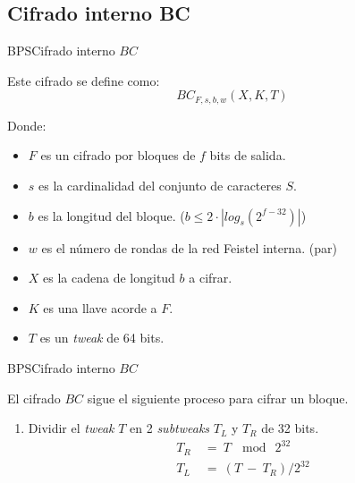 %
%

\subsection{Cifrado interno BC}

\begin{frame}{BPS}{Cifrado interno $BC$}

  Este cifrado se define como:
    \begin{equation*}
      BC_{F,s,b,w}(X,K,T)
    \end{equation*}

  Donde:
  \begin{itemize}
    \item $F$ es un cifrado por bloques de $f$ bits de salida.
    \item $s$ es la cardinalidad del conjunto de caracteres $S$.
    \item $b$ es la longitud del bloque. ($b \leq 2 \cdot |log_s(2^{f-32})|$)
    \item $w$ es el número de rondas de la red Feistel interna. (par)
    \item $X$ es la cadena de longitud $b$ a cifrar.
    \item $K$ es una llave acorde a $F$.
    \item $T$ es un \textit{tweak} de 64 bits.
  \end{itemize}

\end{frame}

\begin{frame}{BPS}{Cifrado interno $BC$}

  El cifrado $BC$ sigue el siguiente proceso para cifrar un bloque.

  \begin{enumerate}
    \item Dividir el \textit{tweak} $T$ en 2 \textit{subtweaks} $T_L$ y $T_R$
    de 32 bits.
      \begin{align*}
        T_R\: &=\: T\: \mod\: 2^{32}  \\
        T_L\: &=\: (T\: -\: T_R) / 2^{32}
      \end{align*}
  \end{enumerate}

\end{frame}

